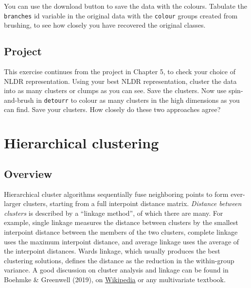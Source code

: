\documentclass[
  letterpaper,
]{krantz}
\begin{document}
You can use the download button to save the data with the colours.
Tabulate the \texttt{branches} id variable in the original data with the
\texttt{colour} groups created from brushing, to see how closely you
have recovered the original classes.

\section*{Project}\label{project-3}


This exercise continues from the project in Chapter 5, to check your
choice of NLDR representation. Using your best NLDR representation,
cluster the data into as many clusters or clumps as you can see. Save
the clusters. Now use spin-and-brush in \texttt{detourr} to colour as
many clusters in the high dimensions as you can find. Save your
clusters. How closely do these two approaches agree?

\chapter{Hierarchical clustering}\label{sec-hclust}



\section{Overview}\label{overview}

Hierarchical cluster algorithms sequentially fuse neighboring points to
form ever-larger clusters, starting from a full interpoint distance
matrix. \emph{Distance between clusters} is described by a ``linkage
method'', of which there are many. For example, single linkage measures
the distance between clusters by the smallest interpoint distance
between the members of the two clusters, complete linkage uses the
maximum interpoint distance, and average linkage uses the average of the
interpoint distances. Wards linkage, which usually produces the best
clustering solutions, defines the distance as the reduction in the
within-group variance. A good discussion on cluster analysis and linkage
can be found in Boehmke \& Greenwell (2019), on
\href{https://en.wikipedia.org/wiki/Cluster_analysis}{Wikipedia} or any
multivariate textbook.
\end{document}
